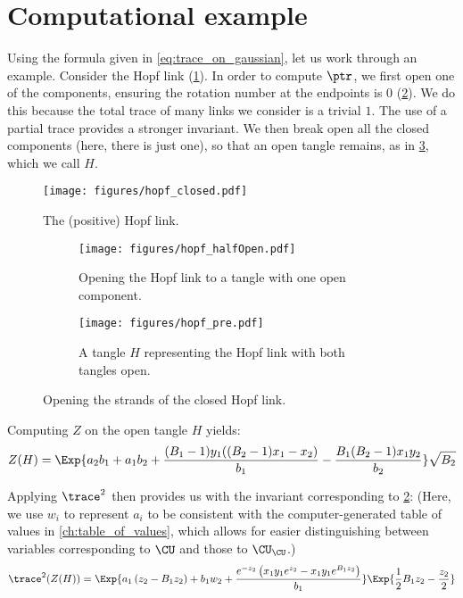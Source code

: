 \section{Computational example}

Using the formula given in \cref{eq:trace_on_gaussian}, let us work through an
example.
Consider the Hopf link (\cref{fig:hopf_closed}). In order to compute $\ptr$, we
first open one of the components, ensuring the rotation number at the endpoints
is $0$ (\cref{fig:hopf_halfOpen}). We do this because the total trace of many
links we consider is a trivial $1$. The use of a partial trace provides a
stronger invariant. We then break open all the closed components (here, there is
just one), so that an open tangle remains, as in \cref{fig:hopf_pre}, which we
call $H$.

\begin{figure}[ht]
        \centering
        \texttt{[image: figures/hopf\_closed.pdf]}
        \caption{The (positive) Hopf link.}
        \label{fig:hopf_closed}
\end{figure}
\begin{figure}[ht]
        \begin{subfigure}[b]{0.5\textwidth}
                \centering
                \texttt{[image: figures/hopf\_halfOpen.pdf]}
                \caption{Opening the Hopf link to a tangle with one open
                component.}
                \label{fig:hopf_halfOpen}
        \end{subfigure}
        \begin{subfigure}[b]{0.5\textwidth}
                \centering
                \texttt{[image: figures/hopf\_pre.pdf]}
                \caption{A tangle $H$ representing the Hopf link with both
                tangles open.}
                \label{fig:hopf_pre}
        \end{subfigure}
        \label{fig:hopf_decompose}
        \caption{Opening the strands of the closed Hopf link.}
\end{figure}

Computing $Z$ on the open tangle $H$ yields:
\begin{equation}
        Z(H) = \Exp{
                a_2 b_1+a_1 b_2+\frac{(B_1-1) y_1
                ((B_2-1) x_1-x_2)}{b_1}-\frac{B_1
                (B_2-1) x_1 y_2}{b_2}
        }
        \sqrt{B_2}
\end{equation}

Applying $\trace^2$ then provides us with the invariant corresponding to
\cref{fig:hopf_halfOpen}: (Here, we use $w_i$ to represent $a_i$ to be
consistent with the computer-generated table of values in
\cref{ch:table_of_values}, which allows for easier distinguishing between
variables corresponding to $\CU$ and those to $\CU_{\CU}$.)
\begin{equation}
        \trace^{2}(Z(H)) = \Exp{
                a_1 \left(z_2-B_1 z_2\right)+b_1 w_2+\frac{e^{-z_2} \left(x_1
                y_1 e^{z_2}-x_1 y_1 e^{B_{1} z_2}\right)}{b_1}
        }
        \Exp{\frac{1}{2} B_{1} z_2-\frac{z_2}{2}}
\end{equation}

